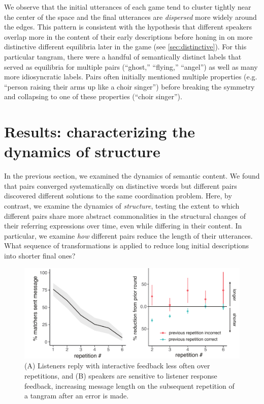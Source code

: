 \documentclass[alpha-refs]{wiley-article}
\begin{document}
We observe that the initial utterances of each game tend to cluster tightly near the center of the space and the final utterances are \emph{dispersed} more widely around the edges. 
This pattern is consistent with the hypothesis that different speakers overlap more in the content of their early descriptions before honing in on more distinctive different equilibria later in the game  (see \ref{sec:distinctive}). 
For this particular tangram, there were a handful of semantically distinct labels that served as equilibria for multiple pairs (``ghost,'' ``flying,'' ``angel'') as well as many more idiosyncratic labels.
Pairs often initially mentioned multiple properties (e.g. ``person raising their arms up like a choir singer'') before breaking the symmetry and collapsing to one of these properties (``choir singer'').


\section{Results: characterizing the dynamics of structure}\label{results}

In the previous section, we examined the dynamics of semantic content.
We found that pairs converged systematically on distinctive words but different pairs discovered different solutions to the same coordination problem. 
Here, by contrast, we examine the dynamics of \emph{structure}, testing the extent to which different pairs share more abstract commonalities in the structural changes of their referring expressions over time, even while differing in their content. 
In particular, we examine \emph{how} different pairs reduce the length of their utterances.
What sequence of transformations is applied to reduce long initial descriptions into shorter final ones?

\begin{figure}[t]
\centering
\includegraphics[scale=.85]{listenerFeedback_combined.pdf}
\caption{(A) Listeners reply with interactive feedback less often over repetitions, and (B) speakers are sensitive to listener response feedback, increasing message length on the subsequent repetition of a tangram after an error is made.}
\label{fig:feedback}
\end{figure}
\end{document}
